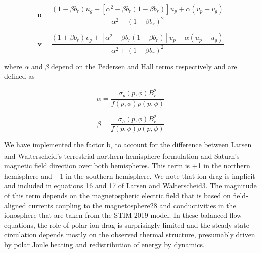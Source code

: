 \begin{equation}
	\mathbf{u} = \frac{(1 - \beta b_r)u_g +  [\alpha^2 - \beta b_r(1 - \beta b_r)]u_p + \alpha (v_p - v_g)}{\alpha^2 + (1 + \beta b_r)^2}
\end{equation}

\begin{equation}
	\mathbf{v} = \frac{(1 + \beta b_r)v_g + [\alpha^2 -\beta b_r(1 - \beta b_r)]v_p - \alpha (u_p - u_g)}{\alpha^2 + (1 - \beta b_r)^2}
\end{equation}

where $\alpha$ and $\beta$ depend on the Pedersen and Hall terms respectively and are defined as

\begin{equation}
    \alpha = \frac{\sigma_p(p,\phi)B_r^2}{f(p,\phi) \rho(p,\phi)}
\end{equation}

\begin{equation}
    \beta = \frac{\sigma_h(p,\phi)B_r^2}{f(p,\phi) \rho(p,\phi)}
\end{equation}

We have implemented the factor b\textsubscript{r} to account for the difference between Larsen and Walterscheid’s terrestrial northern hemisphere formulation and Saturn’s magnetic field direction over both hemispheres. This term is +1 in the northern hemisphere and −1 in the southern hemisphere. We note that ion drag is implicit and included in equations 16 and 17 of Larsen and Walterscheid3. The magnitude of this term depends on the magnetospheric electric field that is based on field-aligned currents coupling to the magnetosphere28 and conductivities in the ionosphere that are taken from the STIM 2019 model. In these balanced flow equations, the role of polar ion drag is surprisingly limited and the steady-state circulation depends mostly on the observed thermal structure, presumably driven by polar Joule heating and redistribution of energy by dynamics.